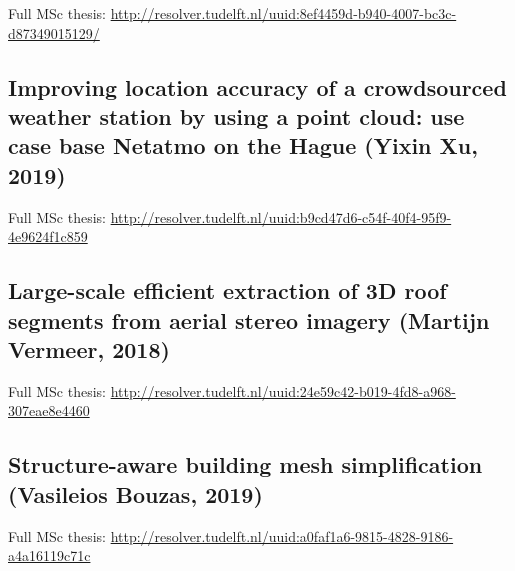 \begin{kaobox}[frametitle=\faExternalLink\ To read or to watch.]
Full MSc thesis: \url{http://resolver.tudelft.nl/uuid:8ef4459d-b940-4007-bc3c-d87349015129/}
\end{kaobox}

\subsection{Improving location accuracy of a crowdsourced weather station by using a point cloud: use case base Netatmo on the Hague (Yixin Xu, 2019)}

\begin{kaobox}[frametitle=\faExternalLink\ To read or to watch.]
Full MSc thesis: \url{http://resolver.tudelft.nl/uuid:b9cd47d6-c54f-40f4-95f9-4e9624f1c859}
\end{kaobox}

\subsection{Large-scale efficient extraction of 3D roof segments from aerial stereo imagery (Martijn Vermeer, 2018)}

\begin{kaobox}[frametitle=\faExternalLink\ To read or to watch.]
Full MSc thesis: \url{http://resolver.tudelft.nl/uuid:24e59c42-b019-4fd8-a968-307eae8e4460}
\end{kaobox}

\subsection{Structure-aware building mesh simplification (Vasileios Bouzas, 2019)}

\begin{kaobox}[frametitle=\faExternalLink\ To read or to watch.]
Full MSc thesis: \url{http://resolver.tudelft.nl/uuid:a0faf1a6-9815-4828-9186-a4a16119c71c}
\end{kaobox}

